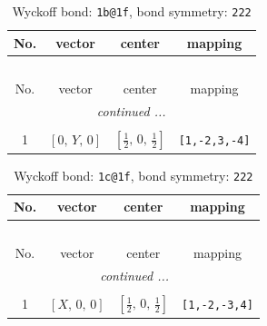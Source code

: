 \documentclass[fleqn,8pt]{jsarticle}
\begin{document}
\renewcommand{\arraystretch}{1.2}
\begin{longtable}{cccc}
\caption{Wyckoff bond: {\tt 1b@1f}, bond symmetry: {\tt 222}}
 \\
 \hline \hline
No. & vector & center & mapping \\ \hline \endfirsthead

\multicolumn{3}{l}{\tablename\ \thetable{}} \\
 \hline \hline
No. & vector & center & mapping \\ \hline \endhead

 \hline \hline
\multicolumn{3}{r}{\footnotesize\it continued ...} \\ \endfoot

 \hline \hline
\multicolumn{3}{r}{} \\ \endlastfoot

1 & $\left[ 0,\, Y,\, 0 \right]$ & $\left[ \frac{1}{2},\, 0,\, \frac{1}{2} \right]$ & {\tt [1,-2,3,-4]} \\
\end{longtable}
\renewcommand{\arraystretch}{1.2}
\begin{longtable}{cccc}
\caption{Wyckoff bond: {\tt 1c@1f}, bond symmetry: {\tt 222}}
 \\
 \hline \hline
No. & vector & center & mapping \\ \hline \endfirsthead

\multicolumn{3}{l}{\tablename\ \thetable{}} \\
 \hline \hline
No. & vector & center & mapping \\ \hline \endhead

 \hline \hline
\multicolumn{3}{r}{\footnotesize\it continued ...} \\ \endfoot

 \hline \hline
\multicolumn{3}{r}{} \\ \endlastfoot

1 & $\left[ X,\, 0,\, 0 \right]$ & $\left[ \frac{1}{2},\, 0,\, \frac{1}{2} \right]$ & {\tt [1,-2,-3,4]} \\
\end{longtable}
\renewcommand{\arraystretch}{1.2}
\end{document}
